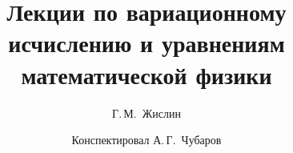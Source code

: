 \documentclass[12pt,a4paper,openany,fleqn]{book}
\newcommand{\mc}[1]{\ensuremath{\mathcal{#1}}}
\theoremstyle{definition}
\begin{document}
	\author{Г.\,М.~Жислин}
	\title{Лекции по вариационному исчислению и уравнениям математической физики}
	\date{Конспектировал А.\,Г.~Чубаров}
	
	
	
	\maketitle
	
	
	\renewcommand{\thepart}{\Asbuk{part}}
	\renewcommand{\thechapter}{\arabic{chapter}}
	\renewcommand{\thesection}{\arabic{section}}
	\renewcommand{\thesubsection}{\Roman{subsection}}
	\renewcommand{\thefootnote}{\roman{footnote}}
	\renewcommand{\phi}{\varphi}
	\renewcommand{\Re}{\ensuremath{\mc{R}e\,}}
	\renewcommand{\Im}{\ensuremath{\mc{I}m\,}}
	
	\setcounter{chapter}{8}
	\chapter{}
	\label{lecture9}
\end{document}
